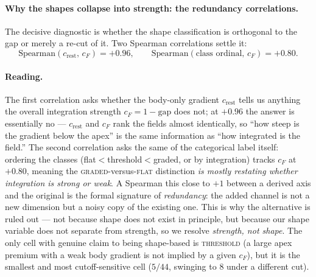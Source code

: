 \documentclass[11pt]{article}
\begin{document}
\paragraph{Why the shapes collapse into strength: the redundancy correlations.} The decisive diagnostic is whether the shape classification is orthogonal to the gap or merely a re-cut of it. Two Spearman correlations settle it:
\[
\mathrm{Spearman}\!\left(c_{\mathrm{rest}},\, c_F\right) = +0.96, \qquad
\mathrm{Spearman}\!\left(\text{class ordinal},\, c_F\right) = +0.80 .
\]

\paragraph{Reading.} The first correlation asks whether the body-only gradient $c_{\mathrm{rest}}$ tells us anything the overall integration strength $c_F = 1-\mathrm{gap}$ does not; at $+0.96$ the answer is essentially no --- $c_{\mathrm{rest}}$ and $c_F$ rank the fields almost identically, so ``how steep is the gradient below the apex'' is the same information as ``how integrated is the field.'' The second correlation asks the same of the categorical label itself: ordering the classes (flat$<$threshold$<$graded, or by integration) tracks $c_F$ at $+0.80$, meaning the \textsc{graded}-versus-\textsc{flat} distinction \emph{is mostly restating whether integration is strong or weak}. A Spearman this close to $+1$ between a derived axis and the original is the formal signature of \emph{redundancy}: the added channel is not a new dimension but a noisy copy of the existing one. This is why the alternative is ruled out --- not because shape does not exist in principle, but because our shape variable does not separate from strength, so we resolve \emph{strength, not shape}. The only cell with genuine claim to being shape-based is \textsc{threshold} (a large apex premium with a weak body gradient is not implied by a given $c_F$), but it is the smallest and most cutoff-sensitive cell ($5/44$, swinging to $8$ under a different cut).
\end{document}
